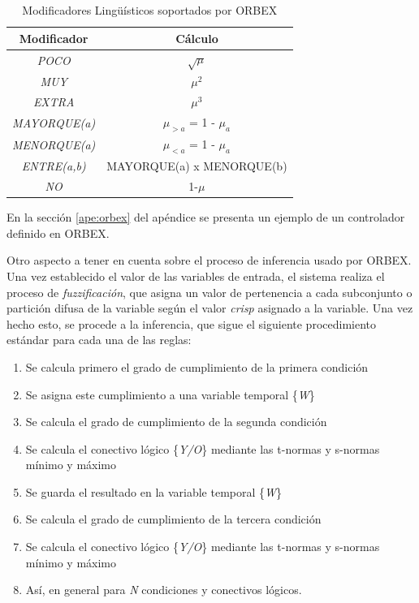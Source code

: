 \begin{table}[htb]
  \centering
  \begin{tabular}{|c|c|}
    \hline
    \rowcolor[gray]{0.9} \textbf{Modificador} & \textbf{Cálculo} \\
    \hline
    \hline
    \textit{POCO} & $\sqrt{\mu}$ \\ \hline
    \textit{MUY} & $\mu^{2}$ \\ \hline
    \textit{EXTRA} & $\mu^{3}$ \\ \hline
    \textit{MAYORQUE(a)} & $\mu_{>a}$ = 1 - $\mu_{a}$\\ \hline
    \textit{MENORQUE(a)} & $\mu_{<a}$ = 1 - $\mu_{a}$ \\ \hline
    \textit{ENTRE(a,b)} & MAYORQUE(a) x MENORQUE(b) \\ \hline
    \textit{NO} & 1-$\mu$ \\
    \hline
  \end{tabular}
  \caption{Modificadores Lingüísticos soportados por ORBEX}
  \label{modificadores}
\end{table}

En la sección \ref{ape:orbex} del apéndice se presenta un ejemplo de un controlador definido en \gls{ORBEX}.

Otro aspecto a tener en cuenta sobre el proceso de inferencia usado por \gls{ORBEX}. Una vez establecido el valor de las variables de entrada, el sistema realiza el proceso de \textit{fuzzificación}, que asigna un valor de pertenencia a cada subconjunto o partición difusa de la variable según el valor \textit{crisp} asignado a la variable. Una vez hecho esto, se procede a la inferencia, que sigue el siguiente procedimiento estándar para cada una de las reglas:

\begin{enumerate}
    \item Se calcula primero el grado de cumplimiento de la primera condición
    \item Se asigna este cumplimiento a una variable temporal \{\textit{W}\}
    \item Se calcula el grado de cumplimiento de la segunda condición
    \item Se calcula el conectivo lógico \{\textit{Y/O}\} mediante las t-normas y s-normas mínimo y máximo
    \item Se guarda el resultado en la variable temporal \{\textit{W}\}
    \item Se calcula el grado de cumplimiento de la tercera condición
    \item Se calcula el conectivo lógico \{\textit{Y/O}\} mediante las t-normas y s-normas mínimo y máximo
    \item Así, en general para \textit{N} condiciones y conectivos lógicos.
\end{enumerate}

